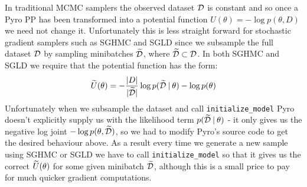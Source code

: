 In traditional MCMC samplers the observed dataset $\mathcal{D}$ is constant and so once a Pyro PP has been transformed into a potential function $U(\theta) = - \log p(\theta, D)$ we need not change it. Unfortunately this is less straight forward for stochastic gradient samplers such as SGHMC and SGLD since we subsample the full dataset $\mathcal{D}$ by sampling minibatches $\widetilde{\mathcal{D}}$, where $\widetilde{\mathcal{D}} \subset \mathcal{D}$. In both SGHMC and SGLD we require that the potential function has the form:
$$\widetilde{U}(\theta) =  -\frac{|D|}{|\widetilde{\mathcal{D}}|} \log p(\widetilde{\mathcal{D}} \: | \: \theta) - \log p (\theta)$$
Unfortunately when we subsample the dataset and call \texttt{initialize\_model} Pyro doesn't explicitly supply us with the likelihood term $p(\widetilde{\mathcal{D}} \: | \: \theta)$ - it only gives us the negative log joint $- \log p(\theta, \widetilde{\mathcal{D}})$, so we had to modify Pyro's source code to get the desired behaviour above. As a result every time we generate a new sample using SGHMC or SGLD we have to call \texttt{initialize\_model} so that it gives us the correct $\widetilde{U}(\theta)$ for some given minibatch $\widetilde{\mathcal{D}}$, although this is a small price to pay for much quicker gradient computations.